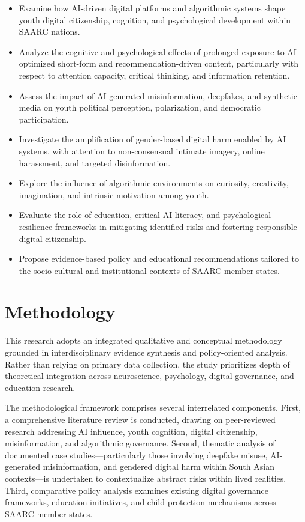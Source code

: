 \documentclass[12pt,a4paper]{report}
\begin{document}
\begin{itemize}
  \item Examine how AI-driven digital platforms and algorithmic systems shape youth digital citizenship, cognition, and psychological development within SAARC nations.
  \item Analyze the cognitive and psychological effects of prolonged exposure to AI-optimized short-form and recommendation-driven content, particularly with respect to attention capacity, critical thinking, and information retention.
  \item Assess the impact of AI-generated misinformation, deepfakes, and synthetic media on youth political perception, polarization, and democratic participation.
  \item Investigate the amplification of gender-based digital harm enabled by AI systems, with attention to non-consensual intimate imagery, online harassment, and targeted disinformation.
  \item Explore the influence of algorithmic environments on curiosity, creativity, imagination, and intrinsic motivation among youth.
  \item Evaluate the role of education, critical AI literacy, and psychological resilience frameworks in mitigating identified risks and fostering responsible digital citizenship.
  \item Propose evidence-based policy and educational recommendations tailored to the socio-cultural and institutional contexts of SAARC member states.
\end{itemize}

\section{Methodology}

This research adopts an integrated qualitative and conceptual methodology grounded in interdisciplinary evidence synthesis and policy-oriented analysis. Rather than relying on primary data collection, the study prioritizes depth of theoretical integration across neuroscience, psychology, digital governance, and education research.

The methodological framework comprises several interrelated components. First, a comprehensive literature review is conducted, drawing on peer-reviewed research addressing AI influence, youth cognition, digital citizenship, misinformation, and algorithmic governance. Second, thematic analysis of documented case studies—particularly those involving deepfake misuse, AI-generated misinformation, and gendered digital harm within South Asian contexts—is undertaken to contextualize abstract risks within lived realities. Third, comparative policy analysis examines existing digital governance frameworks, education initiatives, and child protection mechanisms across SAARC member states.
\end{document}
